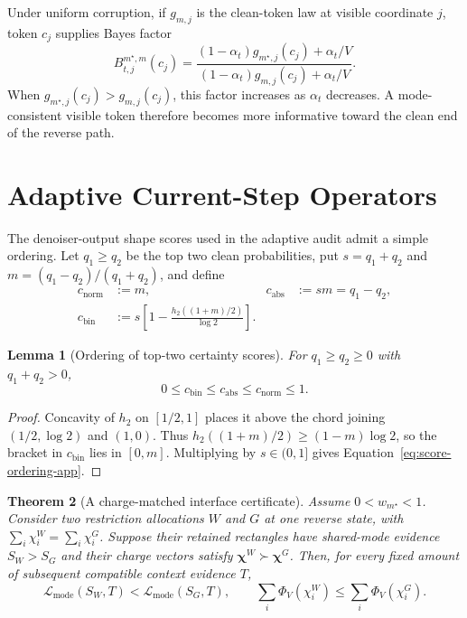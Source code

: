 \documentclass{article}
\newcommand{\1}{\mathbf 1}
\newtheorem{theorem}{Theorem}
\newtheorem{lemma}[theorem]{Lemma}
\theoremstyle{definition}
\begin{document}
Under uniform corruption, if $g_{m,j}$ is the clean-token law at visible
coordinate $j$, token $c_j$ supplies Bayes factor
\begin{equation}
 B_{t,j}^{m^\star,m}(c_j)
 =\frac{(1-\alpha_t)g_{m^\star,j}(c_j)+\alpha_t/V}
 {(1-\alpha_t)g_{m,j}(c_j)+\alpha_t/V}.
 \label{eq:uniform-anchor-bf-app}
\end{equation}
When $g_{m^\star,j}(c_j)>g_{m,j}(c_j)$, this factor increases as
$\alpha_t$ decreases. A mode-consistent visible token therefore becomes more
informative toward the clean end of the reverse path.

\iffalse
\section{Adaptive Current-Step Operators}
\label{app:adaptive-current-step}

The denoiser-output shape scores used in the adaptive audit admit a simple ordering.
Let $q_1\ge q_2$ be the top two clean probabilities, put
$s=q_1+q_2$ and $m=(q_1-q_2)/(q_1+q_2)$, and define
\begin{align}
 c_{\mathrm{norm}}&:=m,
 &c_{\mathrm{abs}}&:=sm=q_1-q_2,\nonumber\\
 c_{\mathrm{bin}}&:=s\left[1-
 \frac{h_2((1+m)/2)}{\log2}\right].
 \label{eq:score-definitions-app}
\end{align}

\begin{lemma}[Ordering of top-two certainty scores]
\label{lem:score-ordering}
For $q_1\ge q_2\ge0$ with $q_1+q_2>0$,
\begin{equation}
 0\le c_{\mathrm{bin}}
 \le c_{\mathrm{abs}}
 \le c_{\mathrm{norm}}
 \le1.
 \label{eq:score-ordering-app}
\end{equation}
\end{lemma}

\begin{proof}
Concavity of $h_2$ on $[1/2,1]$ places it above the chord joining
$(1/2,\log2)$ and $(1,0)$. Thus
$h_2((1+m)/2)\ge(1-m)\log2$, so the bracket in
$c_{\mathrm{bin}}$ lies in $[0,m]$. Multiplying by $s\in(0,1]$ gives
Equation~\eqref{eq:score-ordering-app}.
\end{proof}

\begin{theorem}[A charge-matched interface certificate]
\label{thm:charge-matched-certificate}
Assume $0<w_{m^\star}<1$. Consider two restriction allocations $W$ and $G$ at
one reverse state, with
$\sum_i\chi_i^W=\sum_i\chi_i^G$. Suppose their retained rectangles have
shared-mode evidence $S_W>S_G$ and their charge vectors satisfy
$\boldsymbol\chi^W\succ\boldsymbol\chi^G$. Then, for every fixed amount of
subsequent compatible context evidence $T$,
\begin{equation}
 \mathcal L_{\mathrm{mode}}(S_W,T)
 <\mathcal L_{\mathrm{mode}}(S_G,T),
 \qquad
 \sum_i\Phi_V(\chi_i^W)
 \le\sum_i\Phi_V(\chi_i^G).
 \label{eq:charge-matched-certificate-app}
\end{equation}
\end{theorem}
\end{document}
